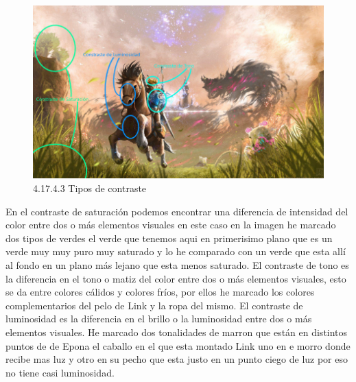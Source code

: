 \documentclass[12pt]{article}
\begin{document}
        \begin{figure}[H]
          \centering
          \includegraphics[width=\textwidth]{images/Saúl/Sección 17/EA_img17_4Color_3Contrastes.png}
          \caption{\small 4.17.4.3 Tipos de contraste}
        \end{figure}
        En el contraste de saturación podemos encontrar una diferencia de intensidad del color entre dos o más elementos visuales en este caso en la imagen he marcado dos tipos de verdes el verde que tenemos aqui en primerisimo plano que es un verde muy muy puro muy saturado y lo he comparado con un verde que esta allí al fondo en un plano más lejano que esta menos saturado. El contraste de tono es la diferencia en el tono o matiz del color entre dos o más elementos visuales, esto se da entre colores cálidos y colores fríos, por ellos he marcado los colores complementarios del pelo de Link y la ropa del mismo. El contraste de luminosidad es la diferencia en el brillo o la luminosidad entre dos o más elementos visuales. He marcado dos tonalidades de marron que están en distintos puntos de de Epona el caballo en el que esta montado Link uno en e morro donde recibe mas luz y otro en su pecho que esta justo en un punto ciego de luz por eso no tiene casi luminosidad.
\end{document}

